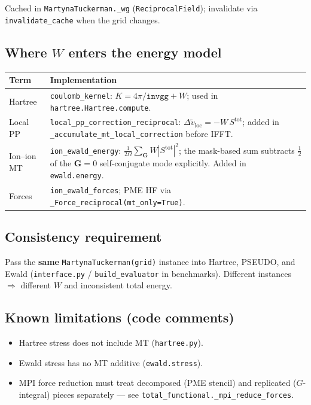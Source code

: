 \documentclass[11pt,a4paper]{article}
\begin{document}
Cached in \texttt{MartynaTuckerman.\_wg} (\texttt{ReciprocalField}); invalidate via
\texttt{invalidate\_cache} when the grid changes.

\subsection{Where $W$ enters the energy model}

\begin{longtable}{@{}p{}p{}@{}}
\toprule
\textbf{Term} & \textbf{Implementation} \\
\midrule
\endhead
Hartree & \texttt{coulomb\_kernel}: $K=4\pi/\texttt{invgg}+W$; used in \texttt{hartree.Hartree.compute}. \\
Local PP & \texttt{local\_pp\_correction\_reciprocal}: $\Delta\tilde v_{\mathrm{loc}}=-W\,S^{\mathrm{tot}}$;
added in \texttt{\_accumulate\_mt\_local\_correction} before IFFT. \\
Ion--ion MT & \texttt{ion\_ewald\_energy}: $\frac{1}{2\Omega}\sum_{\mathbf G} W|S^{\mathrm{tot}}|^2$;
the mask-based sum subtracts $\frac{1}{2}$ of the $\mathbf G=0$ self-conjugate
mode explicitly. Added in \texttt{ewald.energy}. \\
Forces & \texttt{ion\_ewald\_forces}; PME HF via \texttt{\_Force\_reciprocal(mt\_only=True)}. \\
\bottomrule
\end{longtable}

\subsection{Consistency requirement}

Pass the \textbf{same} \texttt{MartynaTuckerman(grid)} instance into Hartree, PSEUDO, and Ewald
(\texttt{interface.py} / \texttt{build\_evaluator} in benchmarks). Different instances $\Rightarrow$
different $W$ and inconsistent total energy.

\subsection{Known limitations (code comments)}

\begin{itemize}
  \item Hartree stress does not include MT (\texttt{hartree.py}).
  \item Ewald stress has no MT additive (\texttt{ewald.stress}).
  \item MPI force reduction must treat decomposed (PME stencil) and replicated ($G$-integral)
        pieces separately --- see \texttt{total\_functional.\_mpi\_reduce\_forces}.
\end{itemize}
\end{document}
